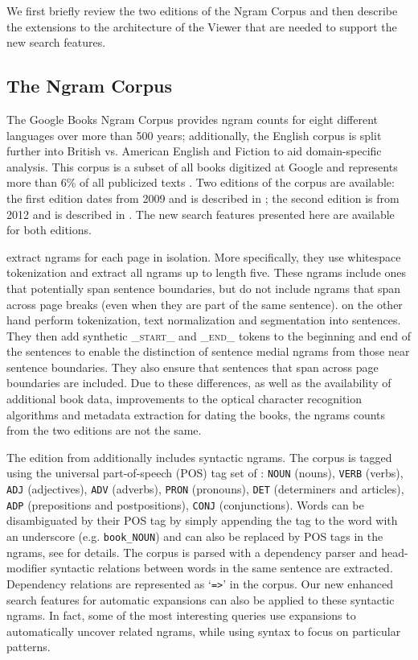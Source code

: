 \documentclass[11pt,a4paper]{article}
\newcommand{\query}[1]{\texttt{#1}}
\begin{document}
We first briefly review the two editions of the Ngram Corpus \cite{culturomics,lin2012syntactic} and then describe the extensions to the architecture of the Viewer that are needed to support the new search features.


\subsection{The Ngram Corpus}
	The Google Books Ngram Corpus provides ngram counts for eight different languages over more than 500 years; additionally, the English corpus is split further into British vs. American English and Fiction to aid domain-specific analysis. This corpus is a subset of all books digitized at Google and represents more than 6\% of all publicized texts \cite{lin2012syntactic}. Two editions of the corpus are available: the first edition dates from 2009 and is described in ; the second edition is from 2012 and is described in . The new search features presented here are available for both editions.

 extract ngrams for each page in isolation. More specifically, they use whitespace tokenization and extract all ngrams up to length five. These ngrams include ones that potentially span sentence boundaries, but do not include ngrams that span across page breaks (even when they are part of the same sentence).
 on the other hand perform tokenization, text normalization and segmentation into sentences. They then add synthetic \textsf{\textsc{\_start\_}} and \textsf{\textsc{\_end\_}} tokens to the beginning and end of the sentences to enable the distinction of sentence medial ngrams from those near sentence boundaries. They also ensure that sentences that span across page boundaries are included. Due to these differences, as well as the availability of additional book data, improvements to the optical character recognition algorithms and metadata extraction for dating the books, the ngrams counts from the two editions are not the same.

The edition from  additionally includes syntactic ngrams. The corpus is tagged using the universal part-of-speech (POS) tag set of : \query{NOUN} (nouns), \query{VERB} (verbs), \query{ADJ} (adjectives), \query{ADV} (adverbs), \query{PRON} (pronouns), \query{DET} (determiners and articles), \query{ADP} (prepositions and postpositions), \query{CONJ} (conjunctions). Words can be disambiguated by their POS tag by simply appending the tag to the word with an underscore (e.g. \texttt{book\_NOUN}) and can also be replaced by POS tags in the ngrams, see  for details. The corpus is  parsed with a dependency parser and head-modifier syntactic relations between words in the same sentence are extracted. Dependency relations are represented as `\query{=>}' in the corpus. Our new enhanced search features for automatic expansions can also be applied to these syntactic ngrams. In fact, some of the most interesting queries use expansions to automatically uncover related ngrams, while using syntax to focus on particular patterns.
\end{document}
